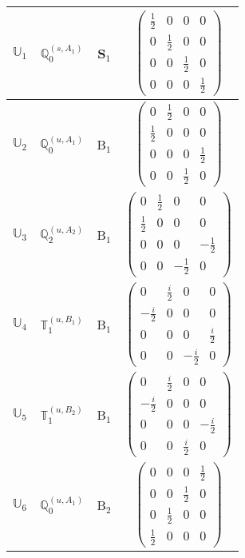 \documentclass[fleqn,10pt,landscape]{article}
\begin{document}
\begin{itemize}
\begin{center}
\begin{longtable}{c|c|c|c}
$ \mathbb{U}_{1} $ & $\mathbb{Q}_{0}^{(s,A_{1})}$ & S$_{1}$ & $\begin{pmatrix} \frac{1}{2} & 0 & 0 & 0 \\ 0 & \frac{1}{2} & 0 & 0 \\ 0 & 0 & \frac{1}{2} & 0 \\ 0 & 0 & 0 & \frac{1}{2} \end{pmatrix}$ \\ \hline
$ \mathbb{U}_{2} $ & $\mathbb{Q}_{0}^{(u,A_{1})}$ & B$_{1}$ & $\begin{pmatrix} 0 & \frac{1}{2} & 0 & 0 \\ \frac{1}{2} & 0 & 0 & 0 \\ 0 & 0 & 0 & \frac{1}{2} \\ 0 & 0 & \frac{1}{2} & 0 \end{pmatrix}$ \\
$ \mathbb{U}_{3} $ & $\mathbb{Q}_{2}^{(u,A_{2})}$ & B$_{1}$ & $\begin{pmatrix} 0 & \frac{1}{2} & 0 & 0 \\ \frac{1}{2} & 0 & 0 & 0 \\ 0 & 0 & 0 & - \frac{1}{2} \\ 0 & 0 & - \frac{1}{2} & 0 \end{pmatrix}$ \\
$ \mathbb{U}_{4} $ & $\mathbb{T}_{1}^{(u,B_{1})}$ & B$_{1}$ & $\begin{pmatrix} 0 & \frac{i}{2} & 0 & 0 \\ - \frac{i}{2} & 0 & 0 & 0 \\ 0 & 0 & 0 & \frac{i}{2} \\ 0 & 0 & - \frac{i}{2} & 0 \end{pmatrix}$ \\
$ \mathbb{U}_{5} $ & $\mathbb{T}_{1}^{(u,B_{2})}$ & B$_{1}$ & $\begin{pmatrix} 0 & \frac{i}{2} & 0 & 0 \\ - \frac{i}{2} & 0 & 0 & 0 \\ 0 & 0 & 0 & - \frac{i}{2} \\ 0 & 0 & \frac{i}{2} & 0 \end{pmatrix}$ \\ \hline
$ \mathbb{U}_{6} $ & $\mathbb{Q}_{0}^{(u,A_{1})}$ & B$_{2}$ & $\begin{pmatrix} 0 & 0 & 0 & \frac{1}{2} \\ 0 & 0 & \frac{1}{2} & 0 \\ 0 & \frac{1}{2} & 0 & 0 \\ \frac{1}{2} & 0 & 0 & 0 \end{pmatrix}$ \\

\end{longtable}
\end{center}
\end{itemize}
\end{document}

